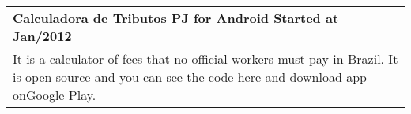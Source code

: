 \documentclass[a4paper, oneside, final]{scrartcl}
\newcommand{\vspc}{\vspace{0.15cm}} %
\begin{document}
\begin{center}

\begin{tabularx}{1\linewidth}{X}
{\bf Calculadora de Tributos PJ for Android \hfill Started at Jan/2012} \\
It is a calculator of fees that no-official workers must pay in Brazil. It is open source and you can see the code {\href{https://github.com/SuelenGC/my-books}{here}} and download app on{\href{https://play.google.com/store/apps/details?id=br.com.suelengc.calctributospj}{Google Play}}.\vspc\\
\end{tabularx}




\end{center}
\end{document}
